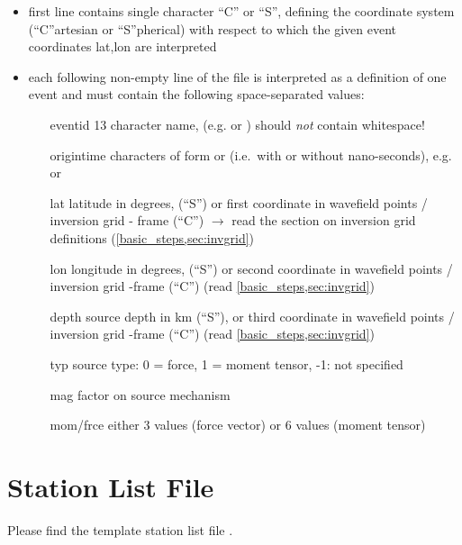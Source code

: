 \begin{itemize}
\item first line contains single character ``C'' or ``S'', defining the coordinate system (``C''artesian or ``S''pherical)
  with respect to which the given event coordinates lat,lon are interpreted
\item each following non-empty line of the file is interpreted as a definition of one event and must 
  contain the following space-separated values:
  \begin{itemize}
  \item[eventid]  13 character name, (e.g.  or ) 
    should \emph{not} contain whitespace!
  \item[origintime]  characters of form  or 
    (i.e.\ with or without nano-seconds), e.g.  or 
  \item[lat] latitude in degrees,  (``S'') or first coordinate in 
    wavefield points / inversion grid - frame (``C'') $\rightarrow$  read the section on inversion grid definitions 
    (\ref{basic_steps,sec:invgrid})
  \item[lon] longitude in degrees,  (``S'') or second  coordinate in 
    wavefield points / inversion grid -frame (``C'') (read \ref{basic_steps,sec:invgrid})
  \item[depth] source depth in km (``S''), or third coordinate in wavefield points / inversion grid -frame (``C'') 
    (read \ref{basic_steps,sec:invgrid})
  \item[typ] source type:  0 = force, 1 = moment tensor, -1: not specified
  \item[mag] factor on source mechanism
  \item[mom/frce] either 3 values (force vector) or 6 values (moment tensor)
  \end{itemize}
\end{itemize}
%
\section{Station List File} \label{files,sec:station_list}
%
Please find the template station list file .

